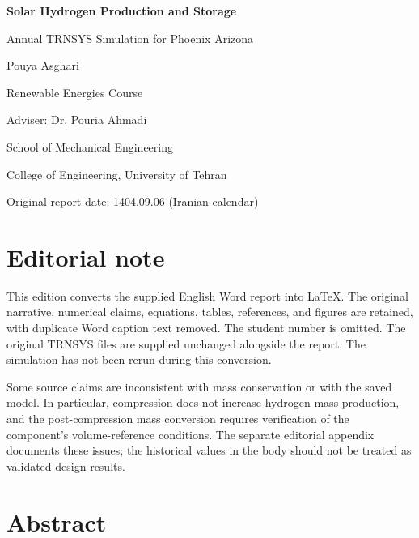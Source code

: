 \documentclass[11pt,a4paper]{article}
\begin{document}
\begin{titlepage}\centering\vspace*{25mm}
{\huge\bfseries Solar Hydrogen Production and Storage\par}\vspace{7mm}
{\Large Annual TRNSYS Simulation for Phoenix Arizona\par}\vspace{8mm}{\large Homework 2\par}\vspace{20mm}
{\Large Pouya Asghari\par}\vspace{10mm}
Renewable Energies Course\par Adviser: Dr. Pouria Ahmadi\par
\vfill School of Mechanical Engineering\par College of Engineering, University of Tehran\par
Original report date: 1404.09.06 (Iranian calendar)\par
\end{titlepage}
\section*{Editorial note}
This edition converts the supplied English Word report into LaTeX. The original narrative, numerical claims, equations, tables, references, and figures are retained, with duplicate Word caption text removed. The student number is omitted. The original TRNSYS files are supplied unchanged alongside the report. The simulation has not been rerun during this conversion.

Some source claims are inconsistent with mass conservation or with the saved model. In particular, compression does not increase hydrogen mass production, and the post-compression mass conversion requires verification of the component's volume-reference conditions. The separate editorial appendix documents these issues; the historical values in the body should not be treated as validated design results.
\begingroup\small\setlength{\parskip}{0pt}\tableofcontents\endgroup\clearpage


\FloatBarrier
\section{Abstract}
\end{document}
